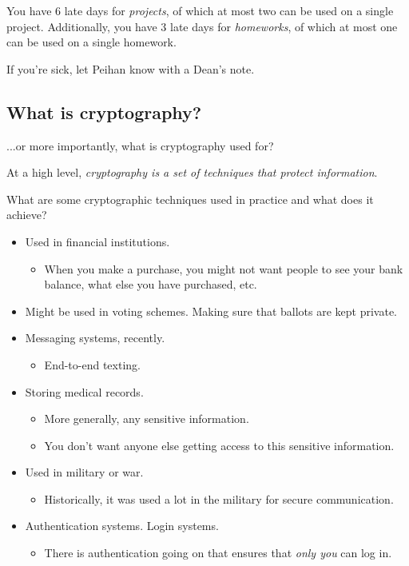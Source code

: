 You have 6 late days for \emph{projects}, of which at most two can be used on a single project. Additionally, you have 3 late days for \emph{homeworks}, of which at most one can be used on a single homework.

If you're sick, let Peihan know with a Dean's note.

\subsection{What is cryptography?}
...or more importantly, what is cryptography used for?

At a high level, \emph{cryptography is a set of techniques that protect information}.

\begin{ques*}
    What are some cryptographic techniques used in practice and what does it achieve?
\end{ques*}
\begin{itemize}
    \item Used in financial institutions.
          \begin{itemize}
              \item When you make a purchase, you might not want people to see your bank balance, what else you have purchased, etc.
          \end{itemize}
    \item Might be used in voting schemes. Making sure that ballots are kept private.
    \item Messaging systems, recently.
          \begin{itemize}
              \item End-to-end texting.
          \end{itemize}
    \item Storing medical records.
          \begin{itemize}
              \item More generally, any sensitive information.
              \item You don't want anyone else getting access to this sensitive information.
          \end{itemize}
    \item Used in military or war.
          \begin{itemize}
              \item Historically, it was used a lot in the military for secure communication.
          \end{itemize}
    \item Authentication systems. Login systems.
          \begin{itemize}
              \item There is authentication going on that ensures that \emph{only you} can log in.
          \end{itemize}
\end{itemize}


